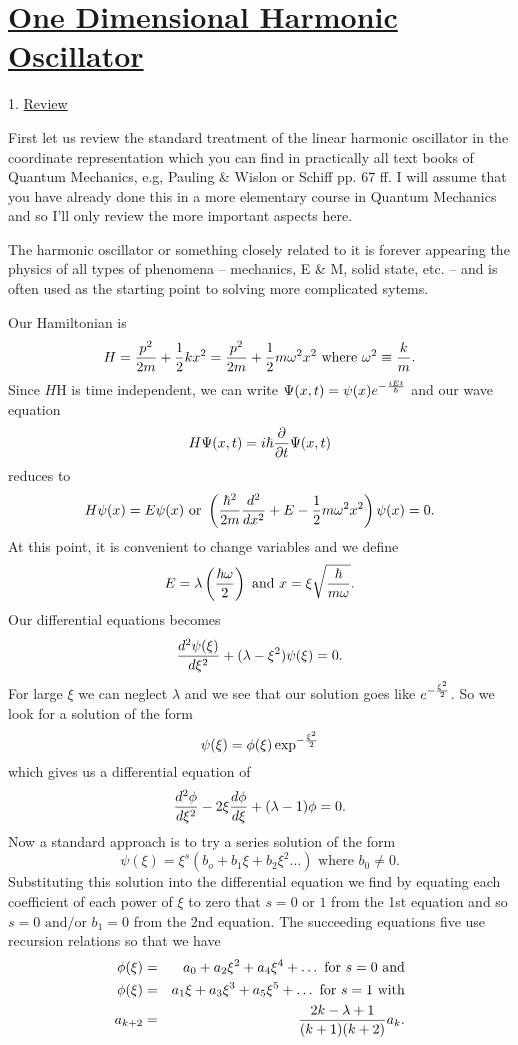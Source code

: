 \section{\underline{One Dimensional Harmonic Oscillator}}

1. \underline{Review}

First let us review the standard treatment of the linear harmonic oscillator in the coordinate representation which you can find in practically all text books of Quantum Mechanics, e.g, Pauling \& Wislon or Schiff pp. 67 ff. I will assume that you 
have already done this in a more elementary course in Quantum Mechanics and so I'll only review the more important aspects here. 

The harmonic oscillator or something closely related to it is forever appearing the physics of all types of phenomena -- mechanics, E \& M, solid state, etc. -- and is often used as the starting point to solving more complicated sytems. 

Our Hamiltonian is
$$H = {p^2\over 2m} + {1\over2} k x^2 = {p^2\over 2m}  + {1\over2}  m \omega^2 x^2  \mbox{   where  } \omega^2\equiv {k \over m}.$$
Since $H$H is time independent, we can write $\displaystyle \Psi(x,t) = \psi(x)e^{-{iEt\over\hbar}}$ and our wave equation 
$$H\Psi(x,t) = i\hbar{\partial \over \partial t}\Psi(x,t)$$ reduces to 
$$H\psi(x) = E \psi(x) \mbox{   or  } \left( {\hbar^2\over 2m}{d^2\over dx^2} + E - {1\over2} m \omega^2 x^2 \right)\psi(x) = 0.$$
At this point, it is convenient to change variables and we define
$$E = \lambda\left({\hbar\omega\over 2}\right) \mbox{    and    } x = \xi\sqrt{ {\hbar\over m \omega}}.$$
Our differential equations becomes
$${d^2 \psi(\xi)\over d\xi^2} + (\lambda - \xi^2)\psi(\xi) = 0.$$
For large $\xi$ we can neglect $\lambda$ and we see that our solution goes like $\displaystyle e^{-{\xi^2\over 2}}$. So we look for a solution of the form
$$\psi(\xi) = \phi(\xi)\exp^{-{\xi^2\over 2}}$$ which gives us a differential equation of 
$${d^2\phi\over d\xi^2} - 2\xi {d\phi\over d\xi} + (\lambda - 1)\phi = 0.$$
Now a standard approach is to try a series solution of the form
$$\psi(\xi) = \xi^s(b_o + b_1 \xi + b_2\xi^2 \hdots)\mbox{   where } b_0 \ne 0.$$
Substituting this solution into the differential equation we find by equating each coefficient of each power of $\xi$ to zero that $s = 0\mbox{  or } 1$ from the 1st equation and so $s=0 \mbox{ and/or } b_1 =0$ from the 2nd
equation. The succeeding equations five use recursion relations so that we have
\begin{eqnarray*}
\phi(\xi) &=& a_0 + a_2 \xi^2 + a_4 \xi^4 + \hdots \mbox{   for } s = 0  \mbox{ and}\\ 
\phi(\xi) &=& a_1\xi + a_3 \xi^3 + a_5 \xi^5 + \hdots \mbox{   for } s = 1  \mbox{ with}\\
a_{k+2} &=& {2k -\lambda + 1\over (k+1)(k+2)} a_k.
\end{eqnarray*}


